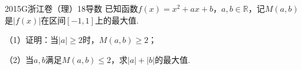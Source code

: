 
\begin{problem}{2015}{G}{浙江卷（理）}{18}{导数}
已知函数$f(x)=x^2+ax+b$，$a,b\in\mathbb{R}$，记$M(a,b)$是$|f(x)|$在区间$[-1,1]$上的最大值.

（1）证明：当$|a|\geq2$时，$M(a,b)\geq2$；

（2）当$a,b$满足$M(a,b)\leq2$，求$|a|+|b|$的最大值.
\end{problem}